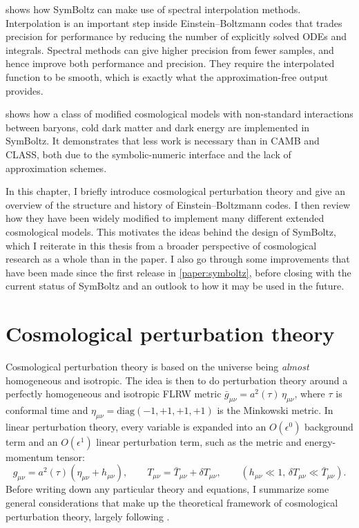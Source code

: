 \documentclass[USenglish, thumbmarks]{uiophdthesis} %
\newcommand\EB{Einstein--Boltzmann}
\begin{document}
 shows how SymBoltz can make use of spectral interpolation methods.
Interpolation is an important step inside \EB{} codes that trades precision for performance by reducing the number of explicitly solved ODEs and integrals.
Spectral methods can give higher precision from fewer samples, and hence improve both performance and precision.
They require the interpolated function to be smooth,
which is exactly what the approximation-free output provides.

 shows how a class of
modified cosmological models with non-standard interactions between baryons, cold dark matter and dark energy
are implemented in SymBoltz.
It demonstrates that less work is necessary than in CAMB and CLASS,
both due to the symbolic-numeric interface and the lack of approximation schemes.

In this chapter, I briefly introduce cosmological perturbation theory
and give an overview of the structure and history of \EB{} codes.
I then review how they have been widely modified to implement many different extended cosmological models.
This motivates the ideas behind the design of SymBoltz,
which I reiterate in this thesis from a broader perspective of cosmological research as a whole than in the paper.
I also go through some improvements that have been made since the first release in \cref{paper:symboltz},
before closing with the current status of SymBoltz and an outlook to how it may be used in the future.

\section{Cosmological perturbation theory}
\label{sec:cpt}

Cosmological perturbation theory is based on the universe being \emph{almost} homogeneous and isotropic.
The idea is then to do perturbation theory around a perfectly homogeneous and isotropic FLRW metric $\bar{g}_{\mu\nu} = a^2(\tau) \, \eta_{\mu\nu}$,
where $\tau$ is conformal time and $\eta_{\mu\nu} = \mathrm{diag}(-1, +1, +1, +1)$ is the Minkowski metric.
In linear perturbation theory,
every variable is expanded into an $O(\epsilon^0)$ background term and an $O(\epsilon^1)$ linear perturbation term, such as the metric and energy-momentum tensor:
\begin{equation}
g_{\mu\nu} = a^2(\tau) (\eta_{\mu\nu} + h_{\mu\nu}) ,
\qquad
T_{\mu\nu} = \bar{T}_{\mu\nu} + \delta T_{\mu\nu} ,
\qquad
(h_{\mu\nu} \ll 1, \, \delta T_{\mu\nu} \ll \bar{T}_{\mu\nu}) .
\end{equation}
Before writing down any particular theory and equations,
I summarize some general considerations that make up the theoretical framework of cosmological perturbation theory,
largely following \cite{dodelsonModernCosmology2021a,baumannNotes}.
\end{document}
